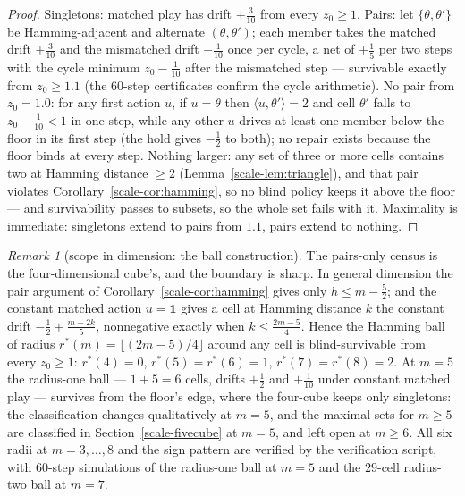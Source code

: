 \documentclass[10pt,twocolumn]{article}
\theoremstyle{plain}
\theoremstyle{definition}
\theoremstyle{remark}
\newtheorem{remark}[theorem]{Remark}
\begin{document}
\begin{proof}
Singletons: matched play has drift \(+\tfrac3{10}\) from every
\(z_{0} \ge 1\). Pairs: let \(\{\theta, \theta'\}\) be
Hamming-adjacent and alternate \((\theta, \theta')\); each member
takes the matched drift \(+\tfrac3{10}\) and the mismatched drift
\(-\tfrac1{10}\) once per cycle, a net of \(+\tfrac15\) per two
steps with the cycle minimum \(z_{0} - \tfrac1{10}\) after the
mismatched step --- survivable exactly from \(z_{0} \ge 1.1\)
(the \(60\)-step certificates confirm the cycle arithmetic).
No pair from \(z_{0} = 1.0\): for any first action \(u\), if
\(u = \theta\) then \(\langle u, \theta'\rangle = 2\) and cell
\(\theta'\) falls to \(z_{0} - \tfrac1{10} < 1\) in one step, while
any other \(u\) drives at least one member below the floor in its
first step (the hold gives \(-\tfrac12\) to both); no repair exists
because the floor binds at every step. Nothing larger: any set of
three or more cells contains two at Hamming distance \(\ge 2\)
(Lemma~\ref{scale-lem:triangle}), and that pair violates
Corollary~\ref{scale-cor:hamming}, so no blind policy keeps it above the
floor --- and survivability passes to subsets, so the whole set fails
with it. Maximality is immediate: singletons extend to pairs from
\(1.1\), pairs extend to nothing.
\end{proof}

\begin{remark}[scope in dimension: the ball construction]
\label{scale-rem:scope}
The pairs-only census is the four-dimensional cube's, and the boundary
is sharp. In general dimension the pair argument of
Corollary~\ref{scale-cor:hamming} gives only \(h \le m - \tfrac52\); and
the constant matched action \(u = \mathbf{1}\) gives a cell at
Hamming distance \(k\) the constant drift
\(-\tfrac12 + \tfrac{m - 2k}{5}\), nonnegative exactly when
\(k \le \tfrac{2m-5}{4}\). Hence the Hamming ball of radius
\(r^{*}(m) = \lfloor (2m - 5)/4 \rfloor\) around any cell is
blind-survivable from every \(z_{0} \ge 1\):
\(r^{*}(4) = 0\), \(r^{*}(5) = r^{*}(6) = 1\),
\(r^{*}(7) = r^{*}(8) = 2\). At \(m = 5\) the radius-one ball ---
\(1 + 5 = 6\) cells, drifts \(+\tfrac12\) and \(+\tfrac1{10}\)
under constant matched play --- survives from the floor's edge, where
the four-cube keeps only singletons: the classification changes
qualitatively at \(m = 5\), and the maximal sets for \(m \ge 5\) are classified in Section~\ref{scale-fivecube} at \(m = 5\), and left open at \(m \ge 6\). All six radii at \(m=3,\ldots,8\) and the sign pattern are
verified by the verification script, with \(60\)-step simulations of the
radius-one ball at \(m = 5\) and the \(29\)-cell radius-two ball at
\(m = 7\).
\end{remark}
\end{document}
